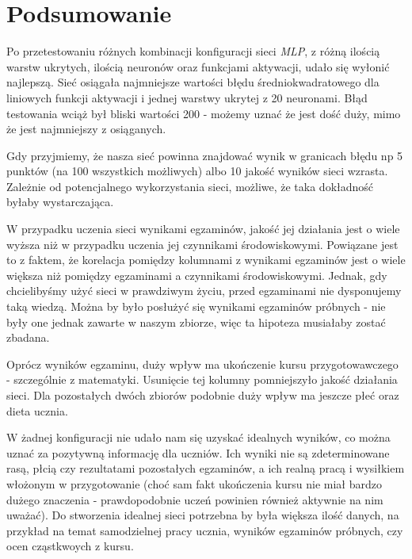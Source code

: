 \documentclass[12pt]{article}
\begin{document}
\pagebreak
\section{Podsumowanie}
Po przetestowaniu różnych kombinacji konfiguracji sieci \textit{MLP}, z różną ilością warstw ukrytych, ilością neuronów oraz funkcjami aktywacji, udało się wyłonić najlepszą. Sieć osiągała najmniejsze wartości błędu średniokwadratowego dla liniowych funkcji aktywacji i jednej warstwy ukrytej z 20 neuronami. Błąd testowania wciąż był bliski wartości 200 - możemy uznać że jest dość duży, mimo że jest najmniejszy z osiąganych. 

Gdy przyjmiemy, że nasza sieć powinna znajdować wynik w granicach błędu np 5 punktów (na 100 wszystkich możliwych) albo 10 jakość wyników sieci wzrasta. Zależnie od potencjalnego wykorzystania sieci, możliwe, że taka dokładność byłaby wystarczająca.

W przypadku uczenia sieci wynikami egzaminów, jakość jej działania jest o wiele wyższa niż w przypadku uczenia jej czynnikami środowiskowymi. Powiązane jest to z faktem, że korelacja pomiędzy kolumnami z wynikami egzaminów jest o wiele większa niż pomiędzy egzaminami a czynnikami środowiskowymi. Jednak, gdy chcielibyśmy użyć sieci w prawdziwym życiu, przed egzaminami nie dysponujemy taką wiedzą. Można by było posłużyć się wynikami egzaminów próbnych -  nie były one jednak zawarte w naszym zbiorze, więc ta hipoteza musiałaby zostać zbadana.

Oprócz wyników egzaminu, duży wpływ ma ukończenie kursu przygotowawczego - szczególnie z matematyki. Usunięcie tej kolumny pomniejszyło jakość działania sieci. Dla pozostałych dwóch zbiorów podobnie duży wpływ ma jeszcze płeć oraz dieta ucznia.

W żadnej konfiguracji nie udało nam się uzyskać idealnych wyników, co można uznać za pozytywną informację dla uczniów. Ich wyniki nie są zdeterminowane rasą, płcią czy rezultatami pozostałych egzaminów, a ich realną pracą i wysiłkiem włożonym w przygotowanie (choć sam fakt ukończenia kursu nie miał bardzo dużego znaczenia - prawdopodobnie uczeń powinien również aktywnie na nim uważać). Do stworzenia idealnej sieci potrzebna by była większa ilość danych, na przykład na temat samodzielnej pracy ucznia, wyników egzaminów próbnych, czy ocen cząstkwoych z kursu. 

\pagebreak
\end{document}
